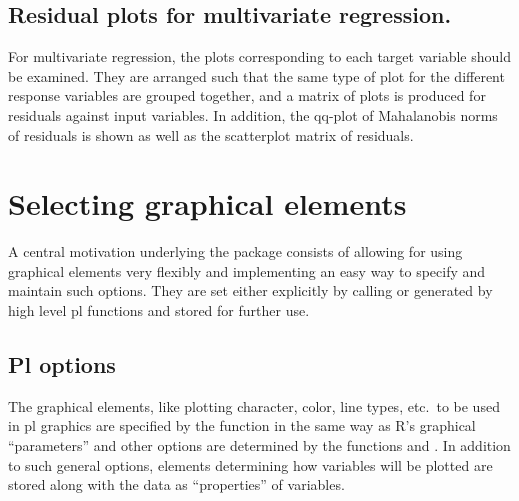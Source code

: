 \documentclass[11pt]{article}\usepackage[]{graphicx}\usepackage[]{color}
\begin{document}

\subsection{Residual plots for multivariate regression.}
For multivariate regression, the plots corresponding to each target
variable should be examined. 
They are arranged such that the same type of plot for the different
response variables are grouped together, and a matrix of plots is produced
for residuals against input variables.
In addition, the qq-plot of Mahalanobis norms of residuals is shown as well
as the scatterplot matrix of residuals.


\section{Selecting graphical elements}
A central motivation underlying the  package consists of
allowing for using graphical elements very flexibly and implementing an
easy way to specify and maintain such options.
They are set either explicitly by calling  or generated
by high level pl functions and stored for further use.

\subsection{Pl options}
The graphical elements, like plotting character, color, line types, etc.\ 
to be used in pl graphics are specified by the function 
in the same way as R's graphical ``parameters'' and other options are 
determined by the functions \T{par} and \T{options}.
In addition to such general options, 
elements determining how variables will be plotted are stored along 
with the data as ``properties'' of variables.
\end{document}
